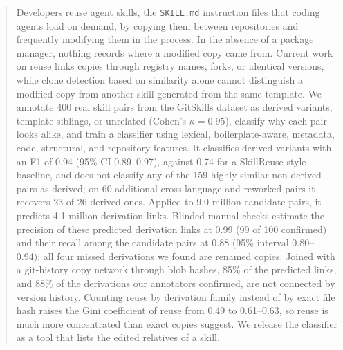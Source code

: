 \documentclass[sigconf,screen]{acmart}
\begin{document}
\begin{abstract}
Developers reuse agent skills, the \texttt{SKILL.md} instruction files that coding agents load on demand, by copying them between repositories and frequently modifying them in the process. In the absence of a package manager, nothing records where a modified copy came from. Current work on reuse links copies through registry names, forks, or identical versions, while clone detection based on similarity alone cannot distinguish a modified copy from another skill generated from the same template. We annotate 400 real skill pairs from the GitSkills dataset as derived variants, template siblings, or unrelated (Cohen's $\kappa = 0.95$), classify why each pair looks alike, and train a classifier using lexical, boilerplate-aware, metadata, code, structural, and repository features. It classifies derived variants with an F1 of 0.94 (95\% CI 0.89--0.97), against 0.74 for a SkillReuse-style baseline, and does not classify any of the 159 highly similar non-derived pairs as derived; on 60 additional cross-language and reworked pairs it recovers 23 of 26 derived ones. Applied to 9.0 million candidate pairs, it predicts 4.1 million derivation links. Blinded manual checks estimate the precision of these predicted derivation links at 0.99 (99 of 100 confirmed) and their recall among the candidate pairs at 0.88 (95\% interval 0.80--0.94); all four missed derivations we found are renamed copies. Joined with a git-history copy network through blob hashes, 85\% of the predicted links, and 88\% of the derivations our annotators confirmed, are not connected by version history. Counting reuse by derivation family instead of by exact file hash raises the Gini coefficient of reuse from 0.49 to 0.61--0.63, so reuse is much more concentrated than exact copies suggest. We release the classifier as a tool that lists the edited relatives of a skill.
\end{abstract}




\begin{teaserfigure}
\vspace{0.3mm}
\end{teaserfigure}
\end{document}
